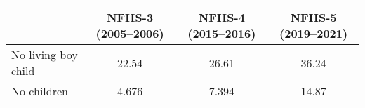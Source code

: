 \begin{tabular}{l*{3}{c}}
\toprule
            &\multicolumn{1}{c}{NFHS-3 (2005–2006)}&\multicolumn{1}{c}{NFHS-4 (2015–2016)}&\multicolumn{1}{c}{NFHS-5 (2019–2021)}\\
\midrule
\midrule
No living boy child&       22.54&       26.61&       36.24\\
No children &       4.676&       7.394&       14.87\\
\bottomrule
\end{tabular}
